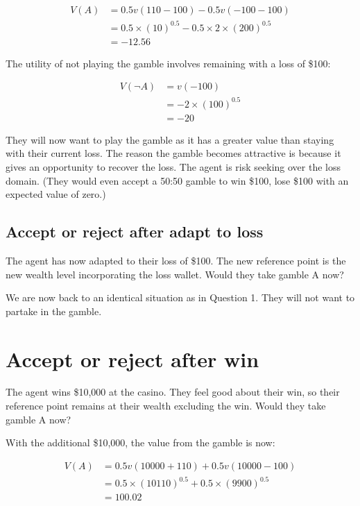 \documentclass[
  letterpaper,
  DIV=11,
  numbers=noendperiod]{scrreprt}
\begin{document}
\begin{align*}
V(A)&=0.5v(110-100)-0.5v(-100-100) \\
&=0.5\times (10)^{0.5}-0.5\times 2\times (200)^{0.5} \\
&=-12.56
\end{align*}

The utility of not playing the gamble involves remaining with a loss of
\$100:

\begin{align*}
V(\neg A)&=v(-100) \\
&=-2\times (100)^{0.5} \\
&=-20
\end{align*}

They will now want to play the gamble as it has a greater value than
staying with their current loss. The reason the gamble becomes
attractive is because it gives an opportunity to recover the loss. The
agent is risk seeking over the loss domain. (They would even accept a
50:50 gamble to win \$100, lose \$100 with an expected value of zero.)

\hypertarget{accept-or-reject-after-adapt-to-loss}{%
\subsection{Accept or reject after adapt to
loss}\label{accept-or-reject-after-adapt-to-loss}}

The agent has now adapted to their loss of \$100. The new reference
point is the new wealth level incorporating the loss wallet. Would they
take gamble A now?

We are now back to an identical situation as in Question 1. They will
not want to partake in the gamble.

\hypertarget{accept-or-reject-after-win}{%
\section{Accept or reject after win}\label{accept-or-reject-after-win}}

The agent wins \$10,000 at the casino. They feel good about their win,
so their reference point remains at their wealth excluding the win.
Would they take gamble A now?

With the additional \$10,000, the value from the gamble is now:

\begin{align*}
V(A)&=0.5v(10000+110)+0.5v(10000-100) \\[6pt]
&=0.5\times (10110)^{0.5}+0.5\times (9900)^{0.5} \\[6pt]
&=100.02
\end{align*}
\end{document}
